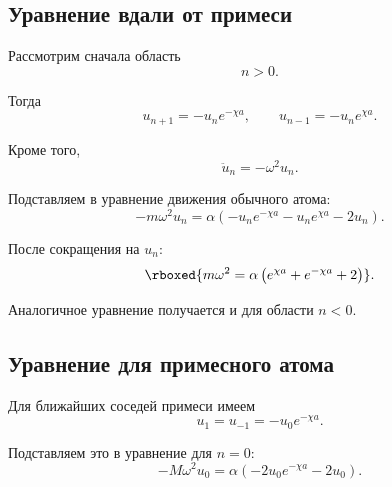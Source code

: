 \documentclass[../final.tex]{subfiles}
\begin{document}
\subsection*{Уравнение вдали от примеси}

Рассмотрим сначала область
%
\begin{equation*}
    n>0.
\end{equation*}

Тогда
%
\begin{equation*}
    u_{n+1}
    =
    -u_n e^{-\chi a},
    \qquad
    u_{n-1}
    =
    -u_n e^{\chi a}.
\end{equation*}

Кроме того,
%
\begin{equation*}
    \ddot u_n
    =
    -\omega^2u_n.
\end{equation*}

Подставляем в уравнение движения обычного атома:
%
\begin{equation*}
    -m\omega^2u_n
    =
    \alpha
    \left(
        -u_ne^{-\chi a}
        -
        u_ne^{\chi a}
        -
        2u_n
    \right).
\end{equation*}

После сокращения на $u_n$:
%
\begin{equation*}
    \rboxed{
        m\omega^2
        =
        \alpha
        \left(
            e^{\chi a}
            +
            e^{-\chi a}
            +
            2
        \right)
    }.
\end{equation*}

Аналогичное уравнение получается и для области $n<0$.



\subsection*{Уравнение для примесного атома}

Для ближайших соседей примеси имеем
%
\begin{equation*}
    u_1
    =
    u_{-1}
    =
    -u_0e^{-\chi a}.
\end{equation*}

Подставляем это в уравнение для $n=0$:
%
\begin{equation*}
    -M\omega^2u_0
    =
    \alpha
    \left(
        -2u_0e^{-\chi a}
        -
        2u_0
    \right).
\end{equation*}
\end{document}
